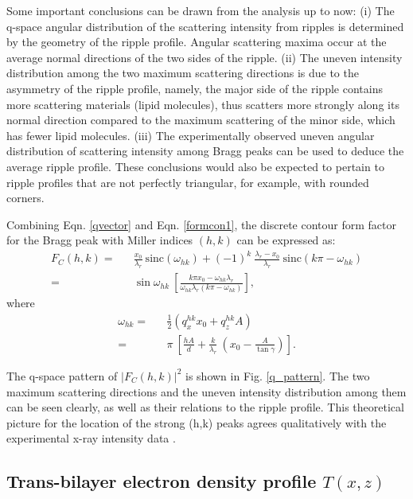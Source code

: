 Some important conclusions can be drawn from the analysis up to now:
(i) The q-space angular distribution of the scattering intensity from 
ripples is 
determined by the geometry of the ripple profile. Angular scattering maxima
occur at the average normal directions of the two sides of the ripple.
(ii) The uneven intensity distribution among the two maximum scattering
directions is due to the asymmetry of the ripple 
profile, namely, the major side of the ripple contains more scattering
materials (lipid molecules), thus scatters more strongly along its normal 
direction compared to the maximum scattering of the minor side, which 
has fewer lipid molecules. (iii) The experimentally observed uneven angular 
distribution of 
scattering intensity among Bragg peaks \cite{Ale85,Wac89a,Kat95} can be used 
to deduce the average ripple profile. These conclusions would also
be expected to pertain to ripple profiles that are not perfectly triangular,
for example, with rounded corners. 

Combining Eqn. \ref{qvector} and Eqn. \ref{formcon1}, the discrete contour form
factor for the Bragg peak with Miller indices $(h,k)$ can be expressed as:
\begin{eqnarray}
\label{discrete}
F_C(h,k) =&& \frac{x_0}{\lambda_r}\ \mbox{sinc}
(\omega_{hk}) + (-1)^k\ \frac{\lambda_r - x_0}{\lambda_r}\ 
\mbox{sinc}(k \pi - \omega_{hk})\nonumber\\
=&& \sin \omega_{hk}\ \left[\frac{k \pi x_0 - 
\omega_{hk} \lambda_r}{\omega_{hk} \lambda_r (k \pi - \omega_{hk})} \right],
\end{eqnarray}
where
\begin{eqnarray}
\label{whk}
\omega_{hk} =&& \frac{1}{2} (q_x^{hk} x_0 + q_z^{hk} A)\nonumber\\
=&& \pi\ \left[ \frac{h A}{d} + \frac{k}{\lambda_r}\ (x_0 -
\frac{A}{\tan \gamma}) \right].
\end{eqnarray}

The q-space pattern of $|F_C(h,k)|^2$ is shown in Fig. \ref{q_pattern}. 
The two maximum scattering directions and the uneven intensity distribution 
among them can be seen clearly, as well as their
relations to the ripple profile. 
This theoretical picture for the location of the strong (h,k) peaks
agrees qualitatively with the experimental x-ray intensity data
\cite{Ale85,Wac89a,Kat95}. 

\subsection{Trans-bilayer electron density profile $T(x,z)$}
\label{rppl_theory_4}

